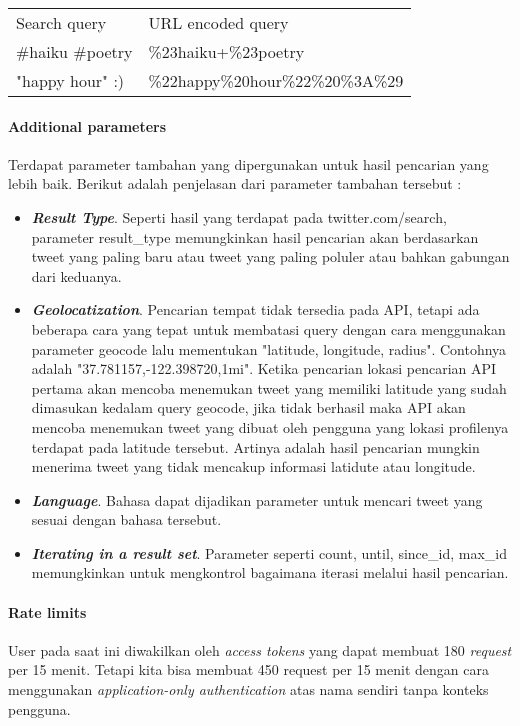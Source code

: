 \begin{table}[h]
\begin{tabular}{ll}
Search query     & URL encoded query                 \\
\#haiku \#poetry & \%23haiku+\%23poetry              \\
"happy hour" :)  & \%22happy\%20hour\%22\%20\%3A\%29
\end{tabular}
\end{table}

\paragraph{Additional parameters}
Terdapat parameter tambahan yang dipergunakan untuk hasil pencarian yang lebih baik. Berikut adalah penjelasan dari parameter tambahan tersebut :

\begin{itemize}
	\item \textbf{\textit{Result Type}}. Seperti hasil yang terdapat pada twitter.com/search, parameter result\_type memungkinkan hasil pencarian akan berdasarkan tweet yang paling baru atau tweet yang paling poluler atau bahkan gabungan dari keduanya.
	\item \textit{\textbf{Geolocatization}}. Pencarian tempat tidak tersedia pada API, tetapi ada beberapa cara yang tepat untuk membatasi query dengan cara menggunakan parameter geocode lalu mementukan "latitude, longitude, radius". Contohnya adalah "37.781157,-122.398720,1mi". Ketika pencarian lokasi pencarian API pertama akan mencoba menemukan tweet yang memiliki latitude yang sudah dimasukan kedalam query geocode, jika tidak berhasil maka API akan mencoba menemukan tweet yang dibuat oleh pengguna yang lokasi profilenya terdapat pada latitude tersebut. Artinya adalah hasil pencarian mungkin menerima tweet yang tidak mencakup informasi latidute atau longitude.
	\item \textit{\textbf{Language}}. Bahasa dapat dijadikan parameter untuk mencari tweet yang sesuai dengan bahasa tersebut.
	\item \textbf{\textit{Iterating in a result set}}. Parameter seperti count, until, since\_id, max\_id memungkinkan untuk mengkontrol bagaimana iterasi melalui hasil pencarian.
\end{itemize}

\paragraph{Rate limits}
User pada saat ini diwakilkan oleh \textit{access tokens} yang dapat membuat 180 \textit{request} per 15 menit. Tetapi kita bisa membuat 450 request per 15 menit dengan cara menggunakan \textit{application-only authentication} atas nama sendiri tanpa konteks pengguna.

